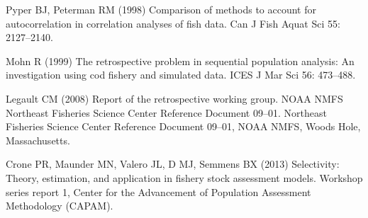 \documentclass[11pt]{article}
\begin{document}
\begin{thebibliography}{10}
Pyper BJ, Peterman RM (1998) Comparison of methods to account for
  autocorrelation in correlation analyses of fish data.
\newblock Can J Fish Aquat Sci 55: 2127--2140.

Mohn R (1999) The retrospective problem in sequential population analysis: An
  investigation using cod fishery and simulated data.
\newblock ICES J Mar Sci 56: 473--488.

Legault CM (2008) Report of the retrospective working group. {NOAA NMFS
  Northeast Fisheries Science Center Reference Document} 09--01.
\newblock Northeast Fisheries Science Center Reference Document 09--01, NOAA
  NMFS, Woods Hole, Massachusetts.

Crone PR, Maunder MN, Valero JL, D MJ, Semmens BX (2013) Selectivity: Theory,
  estimation, and application in fishery stock assessment models.
\newblock Workshop series report 1, Center for the Advancement of Population
  Assessment Methodology (CAPAM).

\end{thebibliography}
\end{document}
